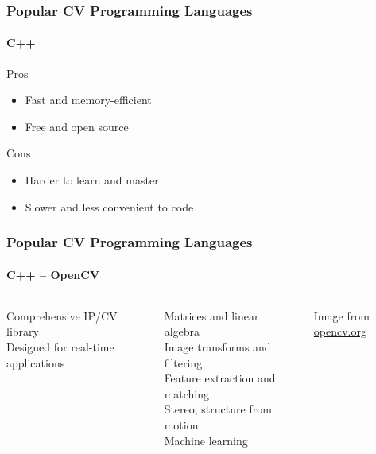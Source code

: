 \documentclass[xetex,professionalfont]{beamer}
\begin{document}

\begin{frame}
\frametitle{Popular CV Programming Languages}
\framesubtitle{C++}

Pros
\begin{itemize}
	\item Fast and memory-efficient
	\item Free and open source
\end{itemize}

\bigskip
Cons
\begin{itemize}
	\item Harder to learn and master
	\item Slower and less convenient to code
\end{itemize}

\end{frame}


\begin{frame}
\frametitle{Popular CV Programming Languages}
\framesubtitle{C++ -- OpenCV}

\begin{columns}

Comprehensive IP/CV library\\\medskip
Designed for real-time applications

\bigskip
Matrices and linear algebra\\\medskip
Image transforms and filtering\\\medskip
Feature extraction and matching\\\medskip
Stereo, structure from motion\\\medskip
Machine learning %


\begin{center}
{
	{\centering Image from \url{opencv.org}}}
\end{center}

\end{columns}

\end{frame}
\end{document}

